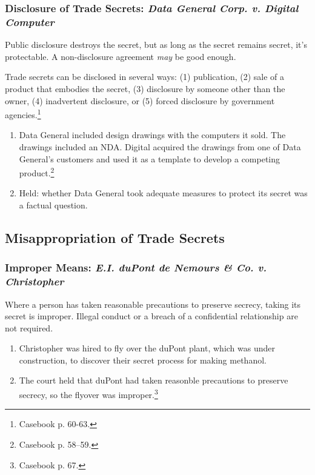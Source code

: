 \subsubsection{Disclosure of Trade Secrets: \emph{Data General Corp. v. 
Digital Computer}}

Public disclosure destroys the secret, but as long as the secret remains 
secret, it's protectable. A non-disclosure agreement \emph{may} be good 
enough.

Trade secrets can be disclosed in several ways: (1) publication, (2) sale of a 
product that embodies the secret, (3) disclosure by someone other than the 
owner, (4) inadvertent disclosure, or (5) forced disclosure by government 
agencies.\footnote{Casebook p. 60-63.}

\begin{enumerate}
    \item Data General included design drawings with the computers it sold. 
    The drawings included an NDA. Digital acquired the drawings from one of 
    Data General's customers and used it as a template to develop a competing 
    product.\footnote{Casebook p. 58--59.}
    \item Held: whether Data General took adequate measures to protect its 
    secret was a factual question.
\end{enumerate}

\subsection{Misappropriation of Trade Secrets}

\subsubsection{Improper Means: \emph{E.I. duPont de Nemours \& Co. v. 
Christopher}}

Where a person has taken reasonable precautions to preserve secrecy, taking 
its secret is improper. Illegal conduct or a breach of a confidential 
relationship are not required.

\begin{enumerate}
    \item Christopher was hired to fly over the duPont plant, which was under 
    construction, to discover their secret process for making methanol.
    \item The court held that duPont had taken reasonble precautions to 
    preserve secrecy, so the flyover was improper.\footnote{Casebook p. 67.}
\end{enumerate}

